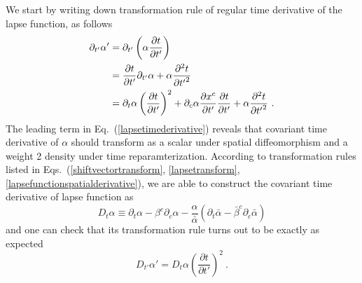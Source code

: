 We start by writing down transformation rule of regular time derivative of the lapse function, as follows
\begin{align}\label{lapsetimederivative}
\partial_{t'}\alpha' & = \partial_{t'}\left(\alpha\frac{\partial t}{\partial t'}\right)\notag\\
& = \frac{\partial t}{\partial t'}\partial_{t'}\alpha + \alpha\frac{\partial^{2}t}{\partial {t'}^{2}}\notag\\
& = \partial_{t}\alpha\left(\frac{\partial t}{\partial t'}\right)^{2} + \partial_{c}\alpha\frac{\partial x^{c}}{\partial t'}\frac{\partial t}{\partial t'} + \alpha\frac{\partial^{2}t}{\partial {t'}^{2}} \ .
\end{align}
The leading term in Eq.~(\ref{lapsetimederivative}) reveals that covariant time derivative of $\alpha$ should transform as a scalar under spatial diffeomorphism and a weight 2 density under time reparamterization. According to transformation rules listed in Eqs.~(\ref{shiftvectortransform}, \ref{lapsetransform}, \ref{lapsefunctionspatialderivative}), we are able to construct the covariant time derivative of lapse function as
\begin{equation}\label{lapsecovarianttimederivative}
	D_{t}\alpha \equiv \partial_{t}\alpha - \beta^{c}\partial_{c}\alpha - \frac{\alpha}{{\bar \alpha}}\left(\partial_{t}{\bar \alpha} - {\bar \beta}^{c}\partial_{c}{\bar \alpha}\right) 
\end{equation}
and one can check that its transformation rule turns out to be exactly as expected
\begin{equation}
	D_{t'}\alpha' = D_{t}\alpha \left(\frac{\partial t}{\partial t'}\right)^{2} \ .
\end{equation}

